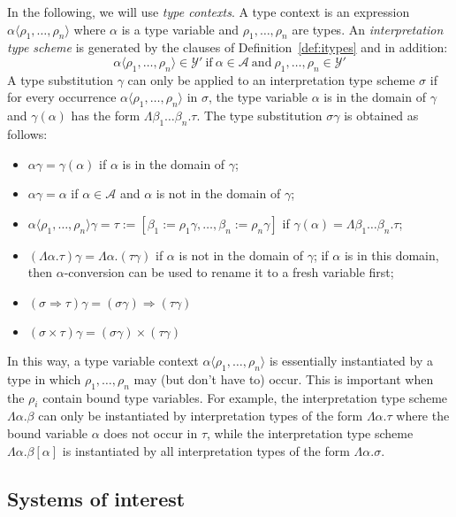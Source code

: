 \documentclass[runningheads,a4paper]{llncs}
\newcommand{\Typevars}{\mathcal{A}}
\newcommand{\ITypes}{\mathcal{Y}}
\newcommand{\arrtype}{\Rightarrow}
\newcommand{\tabs}[2]{\Lambda #1.#2}
\newcommand{\subst}[2]{#1:=#2}
\newcommand{\meta}[2]{#1\langle#2\rangle}
\begin{document}
In the following, we will use \emph{type contexts}.  A type context
is an expression $\meta{\alpha}{\rho_1,\dots,\rho_n}$ where $\alpha$
is a type variable and $\rho_1,\dots,\rho_n$ are types.  An
\emph{interpretation type scheme} is generated by the clauses of
Definition~\ref{def:itypes} and in addition:
\[
\meta{\alpha}{\rho_1,\dots,\rho_n} \in \ITypes'\ \text{if}\ 
  \alpha \in \Typevars\ \text{and}\ \rho_1,\dots,\rho_n \in \ITypes'
\]
A type substitution $\gamma$ can only be applied to an interpretation
type scheme $\sigma$ if for every occurrence $\meta{\alpha}{\rho_1,
\dots,\rho_n}$ in $\sigma$, the type variable $\alpha$ is in the domain
of $\gamma$ and $\gamma(\alpha)$ has the form $\tabs{\beta_1 \dots
\beta_n}{\tau}$.  The type substitution $\sigma\gamma$ is obtained as
follows:
\begin{itemize}
\item $\alpha\gamma = \gamma(\alpha)$ if $\alpha$ is in the domain of
  $\gamma$;
\item $\alpha\gamma = \alpha$ if $\alpha \in \Typevars$ and $\alpha$
  is not in the domain of $\gamma$;
\item $\meta{\alpha}{\rho_1,\dots,\rho_n}\gamma = \subst{\tau}{[
  \beta_1:=\rho_1\gamma,\dots,\beta_n:=\rho_n\gamma]}$ if $\gamma(\alpha) =
  \tabs{\beta_1\dots \beta_n}{\tau}$;
\item $(\tabs{\alpha}{\tau})\gamma = \tabs{\alpha}{(\tau\gamma)}$ if
  $\alpha$ is not in the domain of $\gamma$;
  if $\alpha$ is in this domain, then $\alpha$-conversion can be used
  to rename it to a fresh variable first;
\item $(\sigma \arrtype \tau)\gamma = (\sigma\gamma) \arrtype (\tau
  \gamma)$
\item $(\sigma \times \tau)\gamma = (\sigma\gamma) \times (\tau\gamma)$
\end{itemize}

In this way, a type variable context $\meta{\alpha}{\rho_1,\dots,
\rho_n}$ is essentially instantiated by a type in which $\rho_1,\dots,
\rho_n$ may (but don't have to) occur.  This is important when the
$\rho_i$ contain bound type variables.  For example, the
interpretation type scheme $\tabs{\alpha}{\beta}$ can only be
instantiated by interpretation types of the form $\tabs{\alpha}{\tau}$
where the bound variable $\alpha$ does not occur in $\tau$, while the
interpretation type scheme $\tabs{\alpha}{\beta[\alpha]}$ is
instantiated by all interpretation types of the form
$\tabs{\alpha}{\sigma}$.

\subsection{Systems of interest}
\end{document}
